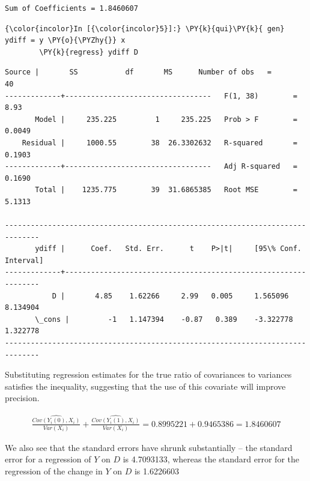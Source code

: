 \documentclass[11pt,notitlepage]{article}\usepackage[]{graphicx}\usepackage[]{color}
\makeatletter
\newenvironment{kframe}{%
 \def\at@end@of@kframe{}%
 \ifinner\ifhmode%
  \def\at@end@of@kframe{\end{minipage}}%
  \begin{minipage}{\columnwidth}%
 \fi\fi%
 \def\FrameCommand##1{\hskip\@totalleftmargin \hskip-\fboxsep
 \colorbox{shadecolor}{##1}\hskip-\fboxsep
     \hskip-\linewidth \hskip-\@totalleftmargin \hskip\columnwidth}%
 \MakeFramed {\advance\hsize-\width
   \@totalleftmargin\z@ \linewidth\hsize
   \@setminipage}}%
 {\par\unskip\endMakeFramed%
 \at@end@of@kframe}
\newenvironment{knitrout}{}{} %
\makeatother
\begin{document}
\begin{enumerate}[a)]
\begin{knitrout}
\begin{kframe}
    \begin{Verbatim}[commandchars=\\\{\}]
Sum of Coefficients = 1.8460607

    \end{Verbatim}

    \begin{Verbatim}[commandchars=\\\{\}]
{\color{incolor}In [{\color{incolor}5}]:} \PY{k}{qui}\PY{k}{ gen} ydiff = y \PY{o}{\PYZhy{}} x
        \PY{k}{regress} ydiff D
\end{Verbatim}

    \begin{Verbatim}[commandchars=\\\{\}]
      Source |       SS           df       MS      Number of obs   =        40
-------------+----------------------------------   F(1, 38)        =      8.93
       Model |     235.225         1     235.225   Prob > F        =    0.0049
    Residual |     1000.55        38  26.3302632   R-squared       =    0.1903
-------------+----------------------------------   Adj R-squared   =    0.1690
       Total |    1235.775        39  31.6865385   Root MSE        =    5.1313

------------------------------------------------------------------------------
       ydiff |      Coef.   Std. Err.      t    P>|t|     [95\% Conf. Interval]
-------------+----------------------------------------------------------------
           D |       4.85    1.62266     2.99   0.005     1.565096    8.134904
       \_cons |         -1   1.147394    -0.87   0.389    -3.322778    1.322778
------------------------------------------------------------------------------

    \end{Verbatim}
\end{kframe}
\end{knitrout}

Substituting regression estimates for the true ratio of covariances to variances satisfies the inequality, suggesting that the use of this covariate will improve precision.

\begin{align*}
\widehat{\frac{Cov(Y_i(0), X_i)}{Var(X_i)}} + \widehat{\frac{Cov(Y_i(1), X_i)}{Var(X_i)}} = 0.8995221 + 0.9465386 = 1.8460607
\end{align*}

We also see that the standard errors have shrunk substantially -- the standard error for a regression of $Y$ on $D$ is 4.7093133, whereas the standard error for the regression of the change in $Y$ on $D$ is 1.6226603


\end{enumerate}
\end{document}
